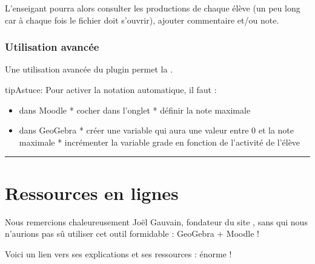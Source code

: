 \documentclass[letterpaper,10pt,french]{sphinxmanual}
\begin{document}
L’enseigant pourra alors consulter les productions de chaque élève (un peu long car
à chaque fois le fichier doit s’ouvrir), ajouter commentaire et/ou note.


\subsection{Utilisation avancée}
\label{\detokenize{projet-description:utilisation-avancee}}
Une utilisation avancée du plugin permet la .

\begin{sphinxadmonition}{tip}{Astuce:}
Pour activer la notation automatique, il faut :
\begin{itemize}
\item {} 
dans Moodle
* cocher  dans l’onglet 
* définir la note maximale

\item {} 
dans GeoGebra
* créer une variable  qui aura une valeur entre 0 et la note maximale
* incrémenter la variable grade en fonction de l’activité de l’élève

\end{itemize}

\noindent{}

\end{sphinxadmonition}


\bigskip\hrule\bigskip



\chapter{Ressources en lignes}
\label{\detokenize{projet-ressources:ressources-en-lignes}}\label{\detokenize{projet-ressources::doc}}
Nous remercions chaleureusement Joël Gauvain, fondateur du site , sans qui nous n’aurions pas sû utiliser cet outil formidable : GeoGebra + Moodle !

Voici un lien vers ses explications et ses ressources : énorme !

\end{document}

